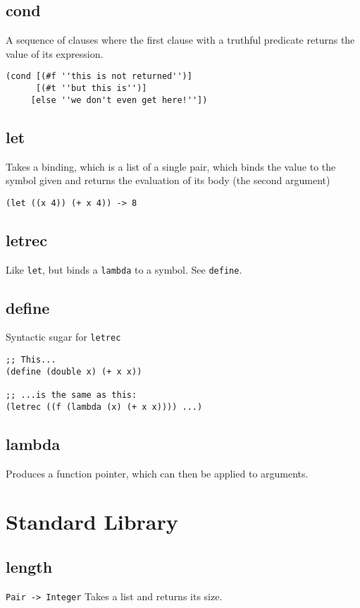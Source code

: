 \subsection*{cond}
A sequence of clauses where the first clause with a truthful predicate returns the value of its expression.

\begin{verbatim}
(cond [(#f ''this is not returned'')]
      [(#t ''but this is'')]
     [else ''we don't even get here!''])
\end{verbatim}

\subsection*{let}
\noindent Takes a binding, which is a list of a single pair, which binds the value to the symbol given and
returns the evaluation of its body (the second argument)

\texttt{(let ((x 4)) (+ x 4)) -> 8}

\subsection*{letrec}
\noindent Like \texttt{let}, but binds a \texttt{lambda} to a symbol. See \texttt{define}.

\subsection*{define}
\noindent Syntactic sugar for \texttt{letrec}

\begin{verbatim}
;; This...
(define (double x) (+ x x))

;; ...is the same as this:
(letrec ((f (lambda (x) (+ x x)))) ...)
\end{verbatim}

\subsection*{lambda}
\noindent Produces a function pointer, which can then be applied to arguments.


\section{Standard Library}

\subsection*{length}
\texttt{Pair -> Integer}
\noindent Takes a list and returns its size.

